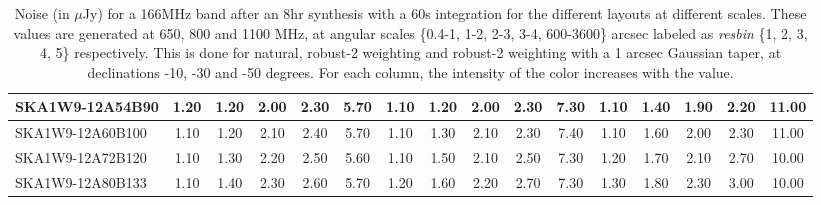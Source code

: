 \begin{table}[H]
{{\begin{tabular}{|lccccc||ccccc||ccccc|}
SKA1W9-12A54B90 & 1.20 \cellcolor{blue!28.50} & 1.20 \cellcolor{red!18.00} & 2.00 \cellcolor{green!18.00} & 2.30 \cellcolor{orange!18.00} & 5.70 \cellcolor{purple!60.00} & 1.10 \cellcolor{blue!18.00} & 1.20 \cellcolor{red!18.00} & 2.00 \cellcolor{green!18.00} & 2.30 \cellcolor{orange!18.00} & 7.30 \cellcolor{purple!49.50} & 1.10 \cellcolor{blue!18.00} & 1.40 \cellcolor{red!18.00} & 1.90 \cellcolor{green!18.00} & 2.20 \cellcolor{orange!18.00} & 11.00 \cellcolor{purple!60.00}\\ \hline 
SKA1W9-12A60B100 & 1.10 \cellcolor{blue!18.00} & 1.20 \cellcolor{red!18.00} & 2.10 \cellcolor{green!28.50} & 2.40 \cellcolor{orange!32.00} & 5.70 \cellcolor{purple!60.00} & 1.10 \cellcolor{blue!18.00} & 1.30 \cellcolor{red!24.00} & 2.10 \cellcolor{green!32.00} & 2.30 \cellcolor{orange!18.00} & 7.40 \cellcolor{purple!60.00} & 1.10 \cellcolor{blue!18.00} & 1.60 \cellcolor{red!34.80} & 2.00 \cellcolor{green!28.50} & 2.30 \cellcolor{orange!23.25} & 11.00 \cellcolor{purple!60.00}\\ \hline 
SKA1W9-12A72B120 & 1.10 \cellcolor{blue!18.00} & 1.30 \cellcolor{red!24.00} & 2.20 \cellcolor{green!39.00} & 2.50 \cellcolor{orange!46.00} & 5.60 \cellcolor{purple!39.00} & 1.10 \cellcolor{blue!18.00} & 1.50 \cellcolor{red!36.00} & 2.10 \cellcolor{green!32.00} & 2.50 \cellcolor{orange!39.00} & 7.30 \cellcolor{purple!49.50} & 1.20 \cellcolor{blue!28.50} & 1.70 \cellcolor{red!43.20} & 2.10 \cellcolor{green!39.00} & 2.70 \cellcolor{orange!44.25} & 10.00 \cellcolor{purple!18.00}\\ \hline 
SKA1W9-12A80B133 & 1.10 \cellcolor{blue!18.00} & 1.40 \cellcolor{red!30.00} & 2.30 \cellcolor{green!49.50} & 2.60 \cellcolor{orange!60.00} & 5.70 \cellcolor{purple!60.00} & 1.20 \cellcolor{blue!28.50} & 1.60 \cellcolor{red!42.00} & 2.20 \cellcolor{green!46.00} & 2.70 \cellcolor{orange!60.00} & 7.30 \cellcolor{purple!49.50} & 1.30 \cellcolor{blue!39.00} & 1.80 \cellcolor{red!51.60} & 2.30 \cellcolor{green!60.00} & 3.00 \cellcolor{orange!60.00} & 10.00 \cellcolor{purple!18.00}\\ \hline 
\end{tabular}}
\vspace{-0.300000cm}
\hspace{1cm} 

\vspace{.50cm}
\caption{Noise (in $\mu$Jy) for a 166MHz band after an 8hr synthesis with a 60s integration for the different layouts at different scales. These values are generated at 650, 800 and 1100 MHz, at angular scales \{0.4-1, 1-2, 2-3, 3-4, 600-3600\} arcsec labeled as {\it resbin} \{1, 2, 3, 4, 5\} respectively. This is done for natural, robust-2 weighting and robust-2 weighting with a 1 arcsec Gaussian taper, at declinations -10, -30 and -50 degrees. For each column, the intensity of the color increases with the value.}\label{tab:noise166}}
 \end{table}
